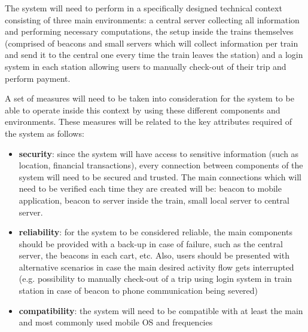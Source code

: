 
The system will need to perform in a specifically designed technical context consisting of three main environments: a central server collecting all information and performing necessary computations, the setup inside the trains themselves (comprised of beacons and small servers which will collect information per train and send it to the central one every time the train leaves the station) and a login system in each station allowing users to manually check-out of their trip and perform payment.

A set of measures will need to be taken into consideration for the system to be able to operate inside this context by using these different components and environments. These measures will be related to the key attributes required of the system as follows:
\begin{itemize}

\item \textbf{security}: since the system will have access to sensitive information (such as location, financial transactions), every connection between components of the system will need to be secured and trusted. The main connections which will need to be verified each time they are created will be: beacon to mobile application, beacon to server inside the train, small local server to central server. 

\item \textbf{reliability}: for the system to be considered reliable, the main components should be provided with a back-up in case of failure, such as the central server, the beacons in each cart, etc. Also, users should be presented with alternative scenarios in case the main desired activity flow gets interrupted (e.g. possibility to manually check-out of a trip using login system in train station in case of beacon to phone communication being severed)

\item \textbf{compatibility}: the system will need to be compatible with at least the main and most commonly used mobile OS and frequencies 

\end{itemize}